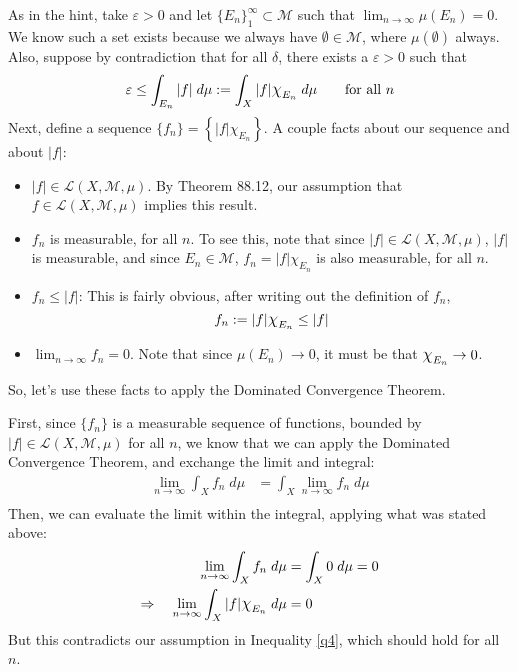 \documentclass[12pt]{article}
\theoremstyle{plain}
\theoremstyle{definition}
\theoremstyle{remark}
\newcommand*{\Chi}{\mbox{\large$\chi$}} %
\begin{document}
\begin{enumerate}
As in the hint, take $\varepsilon>0$ and let $\{E_n\}^\infty_1 \subset \mathscr{M}$ such that $\lim_{n\rightarrow\infty} \mu(E_n)=0$. We know such a set exists because we always have $\emptyset \in \mathscr{M}$, where $\mu(\emptyset)$ always. Also, suppose by contradiction that for all $\delta$, there exists a $\varepsilon>0$ such that 
\begin{equation}
    \label{q4}
    \varepsilon\leq \int_{E_n} |f| \; d\mu :=
    \int_X |f|\Chi_{E_n} \; d\mu
    \qquad\text{for all $n$}
\end{equation}
Next, define a sequence $\{f_n\}=\left\{|f|\chi_{E_n}\right\}$. A couple facts about our sequence and about $|f|$:
\begin{itemize}
    \item $|f|\in\mathscr{L}(X,\mathscr{M},\mu)$. By Theorem 88.12, our assumption that $f\in\mathscr{L}(X,\mathscr{M},\mu)$ implies this result.
    \item $f_n$ is measurable, for all $n$. To see this, note that since $|f|\in\mathscr{L}(X,\mathscr{M},\mu)$, $|f|$ is measurable, and since $E_n\in\mathscr{M}$, $f_n = |f|\chi_{E_n}$ is also measurable, for all $n$.
    \item $f_n \leq |f|$: This is fairly obvious, after writing out the definition of $f_n$, 
\begin{equation}
    \label{dtcapply}
    f_n := |f|\Chi_{E_n}\leq |f|
\end{equation}
    \item $\lim_{n\rightarrow\infty}f_n=0$. Note that since $\mu(E_n)\rightarrow 0$, it must be that $\Chi_{E_n}\rightarrow 0$. 
\end{itemize}
So, let's use these facts to apply the Dominated Convergence Theorem. 

First, since $\{f_n\}$ is a measurable sequence of functions, bounded by $|f|\in\mathscr{L}(X,\mathscr{M},\mu)$ for all $n$, we know that we can apply the Dominated Convergence Theorem, and exchange the limit and integral:
\begin{align*}
    \lim_{n\rightarrow\infty} \int_X f_n \; d\mu&=
    \int_X \lim_{n\rightarrow\infty}f_n \; d\mu  \\ 
\end{align*}
Then, we can evaluate the limit within the integral, applying what was stated above:
\begin{align*}
    \lim_{n\rightarrow\infty} \int_X f_n \; d\mu &=
    \int_X 0 \; d\mu = 0 \\ 
    \Rightarrow\quad
    \lim_{n\rightarrow\infty} \int_X |f|\Chi_{E_n} \; 
    d\mu &= 0
\end{align*}
But this contradicts our assumption in Inequality \ref{q4}, which should hold for all $n$.



\end{enumerate}
\end{document}
